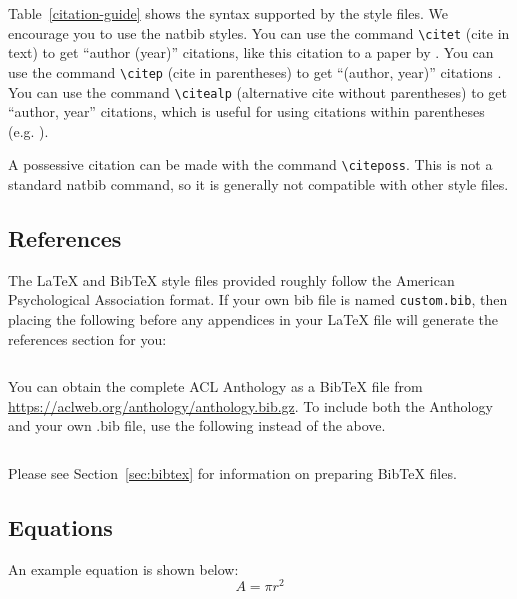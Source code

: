 Table~\ref{citation-guide} shows the syntax supported by the style files.
We encourage you to use the natbib styles.
You can use the command \verb|\citet| (cite in text) to get ``author (year)'' citations, like this citation to a paper by \citet{Gusfield:97}.
You can use the command \verb|\citep| (cite in parentheses) to get ``(author, year)'' citations \citep{Gusfield:97}.
You can use the command \verb|\citealp| (alternative cite without parentheses) to get ``author, year'' citations, which is useful for using citations within parentheses (e.g. \citealp{Gusfield:97}).

A possessive citation can be made with the command \verb|\citeposs|.
This is not a standard natbib command, so it is generally not compatible
with other style files.

\subsection{References}

\nocite{Ando2005,andrew2007scalable,rasooli-tetrault-2015}

The \LaTeX{} and Bib\TeX{} style files provided roughly follow the American Psychological Association format.
If your own bib file is named \texttt{custom.bib}, then placing the following before any appendices in your \LaTeX{} file will generate the references section for you:
\begin{quote}
\begin{verbatim}

\end{verbatim}
\end{quote}

You can obtain the complete ACL Anthology as a Bib\TeX{} file from \url{https://aclweb.org/anthology/anthology.bib.gz}.
To include both the Anthology and your own .bib file, use the following instead of the above.
\begin{quote}
\begin{verbatim}

\end{verbatim}
\end{quote}

Please see Section~\ref{sec:bibtex} for information on preparing Bib\TeX{} files.

\subsection{Equations}

An example equation is shown below:
\begin{equation}
  \label{eq:example}
  A = \pi r^2
\end{equation}

